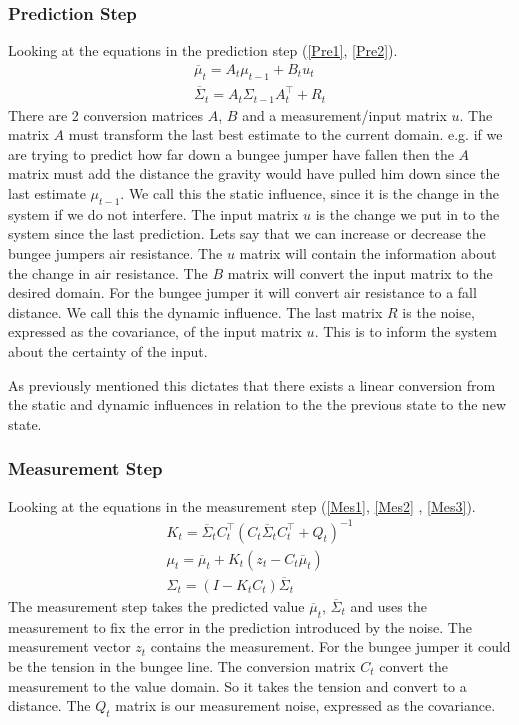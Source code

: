 \subsubsection{Prediction Step}
Looking at the equations in the prediction step (\ref{Pre1}, \ref{Pre2}).
\begin{gather}
\overline{\mu}_t = A_t \mu_{t-1} + B_t u_t
\label{Pre1}\\
\overline{\Sigma}_t = A_t \Sigma_{t-1} A^{\intercal}_t+ R_t
\label{Pre2}
\end{gather}
There are 2 conversion matrices $A$, $B$ and a measurement/input matrix $u$. The matrix $A$ must transform the last best estimate to the current domain. e.g. if we are trying to predict how far down a bungee jumper have fallen then the $A$ matrix must add the distance the gravity would have pulled him down since the last estimate $\mu_{t-1}$. We call this the static influence, since it is the change in the system if we do not interfere. The input matrix $u$ is the change we put in to the system since the last prediction. Lets say that we can increase or decrease the bungee jumpers air resistance. The $u$ matrix will contain the information about the change in air resistance. The $B$ matrix will convert the input matrix to the desired domain. For the bungee jumper it will convert air resistance to a fall distance. We call this the dynamic influence.
The last matrix $R$ is the noise, expressed as the covariance, of the input matrix $u$. This is to inform the system about the certainty of the input. 

As previously mentioned this dictates that there exists a linear conversion from the static and dynamic influences in relation to the the previous state to the new state. 
\subsubsection{Measurement Step}
Looking at the equations in the measurement step (\ref{Mes1}, \ref{Mes2} , \ref{Mes3}).
\begin{gather}
K_t = \overline{\Sigma}_t C^{\intercal}_t ( C_t \overline{\Sigma}_t C^{\intercal}_t + Q_t ) ^{-1} 
\label{Mes1} \\
\mu_{t} = \overline{\mu}_t +K_t (z_t-C_t\overline{\mu}_t) 
\label{Mes2} \\
\Sigma_t = (I-K_t C_t) \overline{\Sigma}_t 
\label{Mes3}
\end{gather}
The measurement step takes the predicted value $\overline{\mu}_t$, $\overline{\Sigma}_t$ and uses the measurement to fix the error in the prediction introduced by the noise. The measurement vector $z_t$ contains the measurement. For the bungee jumper it could be the tension in the bungee line. The conversion matrix $C_t$ convert the measurement to the value domain. So it takes the tension and convert to a distance. The $Q_t$ matrix is our measurement noise, expressed as the covariance.

